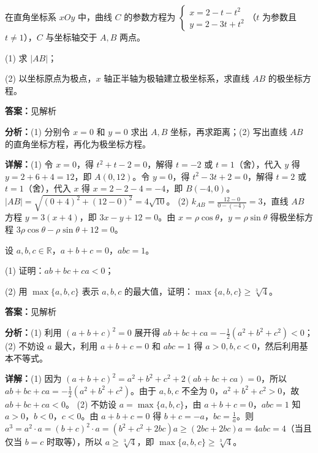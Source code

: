 \begin{question}[points=10]
[选修4-4：坐标系与参数方程]

在直角坐标系 $xOy$ 中，曲线 $C$ 的参数方程为 $\begin{cases} x=2-t-t^2 \\ y=2-3t+t^2 \end{cases}$（$t$ 为参数且 $t\neq1$），$C$ 与坐标轴交于 $A,B$ 两点。

(1) 求 $|AB|$；

(2) 以坐标原点为极点，$x$ 轴正半轴为极轴建立极坐标系，求直线 $AB$ 的极坐标方程。
\begin{solution}
\textbf{答案：}见解析

\textbf{分析：}(1) 分别令 $x=0$ 和 $y=0$ 求出 $A,B$ 坐标，再求距离；(2) 写出直线 $AB$ 的直角坐标方程，再化为极坐标方程。

\textbf{详解：}(1) 令 $x=0$，得 $t^2+t-2=0$，解得 $t=-2$ 或 $t=1$（舍），代入 $y$ 得 $y=2+6+4=12$，即 $A(0,12)$。令 $y=0$，得 $t^2-3t+2=0$，解得 $t=2$ 或 $t=1$（舍），代入 $x$ 得 $x=2-2-4=-4$，即 $B(-4,0)$。$|AB|=\sqrt{(0+4)^2+(12-0)^2}=4\sqrt{10}$。
(2) $k_{AB}=\frac{12-0}{0-(-4)}=3$，直线 $AB$ 方程 $y=3(x+4)$，即 $3x-y+12=0$。由 $x=\rho\cos\theta$，$y=\rho\sin\theta$ 得极坐标方程 $3\rho\cos\theta-\rho\sin\theta+12=0$。
\end{solution}
\end{question}

\begin{question}[points=10]
[选修4-5：不等式选讲]

设 $a,b,c\in\mathbb{R}$，$a+b+c=0$，$abc=1$。

(1) 证明：$ab+bc+ca<0$；

(2) 用 $\max\{a,b,c\}$ 表示 $a,b,c$ 的最大值，证明：$\max\{a,b,c\}\ge\sqrt[3]{4}$。
\begin{solution}
\textbf{答案：}见解析

\textbf{分析：}(1) 利用 $(a+b+c)^2=0$ 展开得 $ab+bc+ca=-\frac12(a^2+b^2+c^2)<0$；(2) 不妨设 $a$ 最大，利用 $a+b+c=0$ 和 $abc=1$ 得 $a>0,b,c<0$，然后利用基本不等式。

\textbf{详解：}(1) 因为 $(a+b+c)^2=a^2+b^2+c^2+2(ab+bc+ca)=0$，所以 $ab+bc+ca=-\frac12(a^2+b^2+c^2)$。由于 $a,b,c$ 不全为 $0$，$a^2+b^2+c^2>0$，故 $ab+bc+ca<0$。
(2) 不妨设 $a=\max\{a,b,c\}$，由 $a+b+c=0$，$abc=1$ 知 $a>0$，$b<0$，$c<0$。由 $a+b+c=0$ 得 $b+c=-a$，$bc=\frac1a$。则 $a^3=a^2\cdot a=(b+c)^2\cdot a=(b^2+c^2+2bc)a\ge (2bc+2bc)a=4abc=4$（当且仅当 $b=c$ 时取等），所以 $a\ge\sqrt[3]{4}$，即 $\max\{a,b,c\}\ge\sqrt[3]{4}$。
\end{solution}
\end{question}

